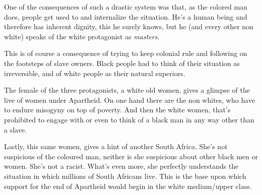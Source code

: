One of the consequences of such a drastic system was that,
as the colored man does,
people get used to and internalize the situation.
He's a human being and therefore has inherent dignity,
this he surely knows,
but he (and every other non white) speaks
of the white protagonist as \textit{masters}.

This is of course a consequence of trying
to keep colonial rule and following on the
footsteps of slave owners.
Black people had to think of their situation as irreversible,
and of white people as their natural superiors.

The female of the three protagonists,
a white old women,
gives a glimpse of the live of women under Apartheid.
On one hand there are the non whites,
who have to endure misogyny on top of poverty.
And then the white women, that's prohibited to engage with
or even to think of a black man in any way other than a slave.

Lastly, this same women,
gives a hint of another South Africa.
She's not suspicious of the coloured man,
neither is she suspicious about other black men or women.
She's not a racist. What's even more,
she perfectly understands the situation in which
millions of South Africans live.
This is the base upon which support for the end of Apartheid
would begin in the white medium/upper class.
%



